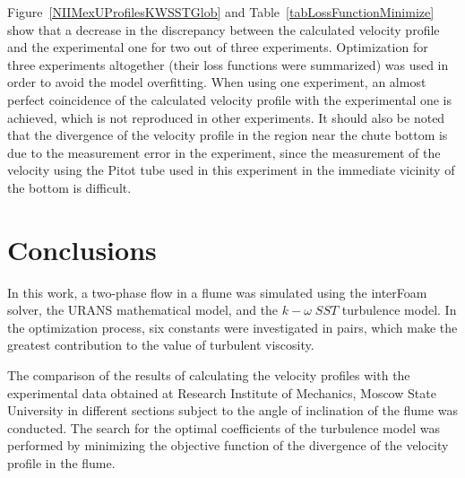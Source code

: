 \documentclass[sensors,article,submit,moreauthors,pdftex]{Definitions/mdpi}
\begin{document}
\begin{paracol}{2}
Figure~\ref{NIIMexUProfilesKWSSTGlob} and Table~\ref{tabLossFunctionMinimize} show that a decrease in the discrepancy between the calculated velocity profile and the experimental one for two out of three experiments. Optimization for three experiments altogether (their loss functions were summarized) was used in order to avoid the model overfitting. When using one experiment, an almost perfect coincidence of the calculated velocity profile with the experimental one is achieved, which is not reproduced in other experiments. It should also be noted that the divergence of the velocity profile in the region near the chute bottom is due to the measurement error in the experiment, since the measurement of the velocity using the Pitot tube used in this experiment in the immediate vicinity of the bottom is difficult.


\section{Conclusions}

In this work, a two-phase flow in a flume was simulated using the interFoam solver, the URANS mathematical model, and the $k-\omega \; SST$ turbulence model. In the optimization process, six constants were investigated in pairs, which make the greatest contribution to the value of turbulent viscosity.

The comparison of the results of calculating the velocity profiles with the experimental data obtained at Research Institute of Mechanics, Moscow State University in different sections subject to the angle of inclination of the flume was conducted. The search for the optimal coefficients of the turbulence model was performed by minimizing the objective function of the divergence of the velocity profile in the flume. %


\end{paracol}
\end{document}
